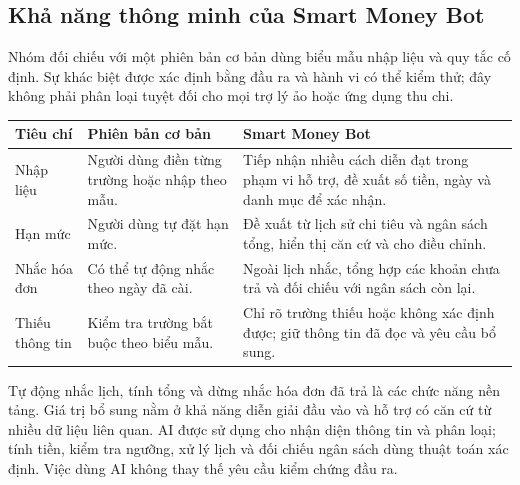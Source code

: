 \documentclass[11pt,a4paper]{article}
\newcommand{\thead}[1]{\rowcolor{tablehead}#1\\\midrule}
\begin{document}
\subsection{Khả năng thông minh của Smart Money Bot}
Nhóm đối chiếu với một phiên bản cơ bản dùng biểu mẫu nhập liệu và quy tắc cố định. Sự khác biệt được xác định bằng đầu ra và hành vi có thể kiểm thử; đây không phải phân loại tuyệt đối cho mọi trợ lý ảo hoặc ứng dụng thu chi.
\begin{longtable}{@{}P{2.2cm}P{5.3cm}P{7.95cm}@{}}
\toprule\thead{\textbf{Tiêu chí}&\textbf{Phiên bản cơ bản}&\textbf{Smart Money Bot}}
\endhead
Nhập liệu&Người dùng điền từng trường hoặc nhập theo mẫu.&Tiếp nhận nhiều cách diễn đạt trong phạm vi hỗ trợ, đề xuất số tiền, ngày và danh mục để xác nhận.\\\midrule
Hạn mức&Người dùng tự đặt hạn mức.&Đề xuất từ lịch sử chi tiêu và ngân sách tổng, hiển thị căn cứ và cho điều chỉnh.\\\midrule
Nhắc hóa đơn&Có thể tự động nhắc theo ngày đã cài.&Ngoài lịch nhắc, tổng hợp các khoản chưa trả và đối chiếu với ngân sách còn lại.\\\midrule
Thiếu thông tin&Kiểm tra trường bắt buộc theo biểu mẫu.&Chỉ rõ trường thiếu hoặc không xác định được; giữ thông tin đã đọc và yêu cầu bổ sung.\\\bottomrule
\end{longtable}

Tự động nhắc lịch, tính tổng và dừng nhắc hóa đơn đã trả là các chức năng nền tảng. Giá trị bổ sung nằm ở khả năng diễn giải đầu vào và hỗ trợ có căn cứ từ nhiều dữ liệu liên quan. AI được sử dụng cho nhận diện thông tin và phân loại; tính tiền, kiểm tra ngưỡng, xử lý lịch và đối chiếu ngân sách dùng thuật toán xác định. Việc dùng AI không thay thế yêu cầu kiểm chứng đầu ra.

\clearpage
\end{document}
